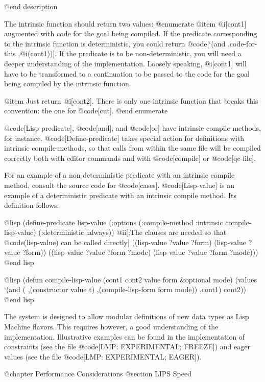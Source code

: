 {@end description

The intrinsic function should return two values: 
@enumerate
@item @i[cont1] augmented with code for the goal being compiled.
If the predicate corresponding to the intrinsic function
is deterministic, you could return @code[`(and ,code-for-this ,@i(cont1))].
If the predicate is to be non-deterministic, you will need a deeper 
understanding of the implementation. Loosely speaking, @i[cont1] will
have to be transformed to a continuation to be passed to the code for the
goal being compiled by the intrinsic function.

@item Just return @i[cont2]. There is only one intrinsic function that breaks
this convention: the one for @code[cut].
@end enumerate

@code[Lisp-predicate], @code[and], and @code[or] have 
intrinsic compile-methods, for instance.
@code[Define-predicate] takes special action for definitions with
intrinsic compile-methods, so that calls from within the same file will be
compiled correctly both with editor commands and with @code[compile] or
@code[qc-file].

For an example of a non-deterministic predicate with an intrinsic compile
method, consult the source code for @code[cases].
@code[Lisp-value] is an example of a deterministic predicate with an intrinsic
compile method. Its definition follows.

@lisp
(define-predicate lisp-value
  (:options (:compile-method :intrinsic compile-lisp-value)
            (:deterministic :always))
  @ii[;The clauses are needed so that @code(lisp-value) can be called directly]
  ((lisp-value ?value ?form) 
   (lisp-value ?value ?form))
  ((lisp-value ?value ?form ?mode) 
   (lisp-value ?value ?form ?mode)))
@end lisp

@lisp
(defun compile-lisp-value (cont1 cont2 value form &optional mode)
  (values `(and (%
                   ,(constructor value t)
                   ,(compile-lisp-form form mode))
                ,cont1)
          cont2))
@end lisp

The system is designed to allow modular definitions of new data types
as Lisp Machine flavors.
This requires however, a good understanding of the implementation.
Illustrative examples can be found in the implementation of constraints
(see the file @code[LMP: EXPERIMENTAL; FREEZE]) and eager values
(see the file @code[LMP: EXPERIMENTAL; EAGER]).

@chapter Performance Considerations
@section LIPS Speed

}
